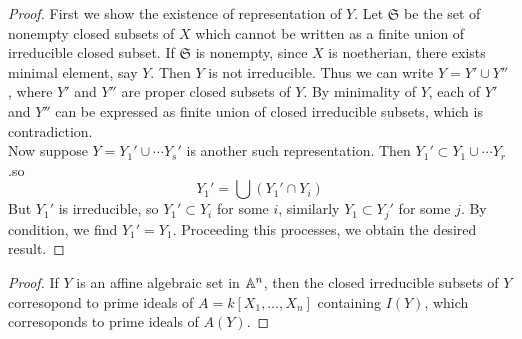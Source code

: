 \documentclass[leqno]{ltjsarticle}
\begin{document}


\begin{proof}
	First we show the existence of representation of $Y$. Let $\mathfrak S$ be the set of nonempty closed subsets of $X$ which cannot be written as a finite union of irreducible closed subset. If $\mathfrak S$ is nonempty, since $X$ is noetherian, there exists minimal element, say $Y$. Then $Y$ is not irreducible. Thus we can write $Y = Y' \cup Y''$, where $Y'$ and $Y''$ are proper closed subsets of $Y$. By minimality of $Y$, each of $Y'$ and $Y''$ can be expressed as finite union of closed irreducible subsets, which is contradiction.\\
	Now suppose $Y=Y_1'\cup \cdots Y_s'$ is another such representation. Then $Y_1'\subset Y_1\cup\cdots Y_r$.so
	\[Y_1' = \bigcup (Y_1'\cap Y_i)\]
	But $Y_1'$ is irreducible, so $Y_1'\subset Y_i$ for some $i$, similarly $Y_1\subset Y_j'$ for some $j$. By condition, we find $Y_1'=Y_1$. Proceeding this processes, we obtain the desired result.
\end{proof}



\begin{proof}
	If $Y$ is an affine algebraic set in $\mathbb A^n$, then the closed irreducible subsets of $Y$ corresopond to prime ideals of $A=k[X_1,\ldots, X_n]$ containing $I(Y)$, which corresoponds to prime ideals of $A(Y)$.
\end{proof}
\end{document}
